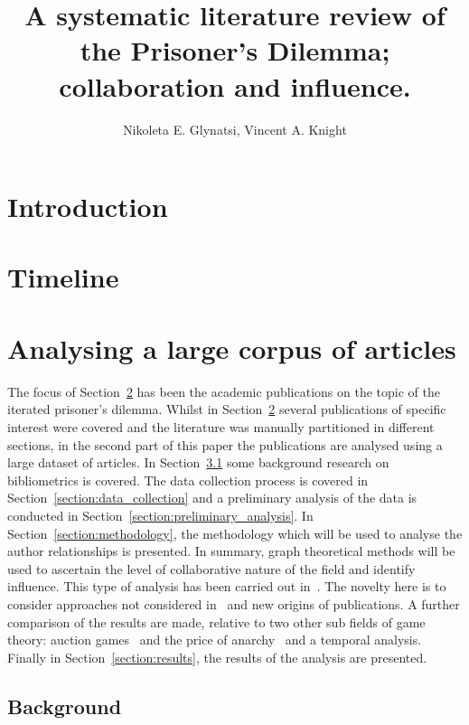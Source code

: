\documentclass{article}
\title{A systematic literature review of the Prisoner's Dilemma; collaboration and influence.}
\author{Nikoleta E. Glynatsi, Vincent A. Knight}
\date{}
\theoremstyle{definition}
\begin{document}
\maketitle

\begin{abstract}

\end{abstract}

\section{Introduction}\label{section:introduction}

\section{Timeline}\label{section:timeline}


\section{Analysing a large corpus of articles}\label{section:analysis}

The focus of Section~\ref{section:timeline} has been the academic publications on
the topic of the iterated prisoner's dilemma. Whilst in Section~\ref{section:timeline}
several publications of specific interest were covered and the literature was manually
partitioned in different sections, in the second part of this paper the publications
are analysed using a large dataset of articles. In Section~\ref{section:background}
some background
research on bibliometrics is covered. The data collection process is covered in
Section~\ref{section:data_collection} and a preliminary analysis of the data is
conducted in Section~\ref{section:preliminary_analysis}. In Section~\ref{section:methodology},
the methodology which will be used to analyse the author relationships is presented.
In summary, graph theoretical methods will be used to ascertain the level of
collaborative nature of the field and identify influence.
This type of analysis has been carried out in~\cite{Liu2015}. The novelty here
is to consider approaches not considered in~\cite{Liu2015} and new origins of
publications. A further comparison of the results are made, relative to
two other sub fields of game theory: auction games~\cite{menezes2005} and
the price of anarchy~\cite{roughgarden2005} and a temporal analysis.
Finally in Section~\ref{section:results}, the results of the analysis are presented.

\subsection{Background}\label{section:background}
\end{document}
